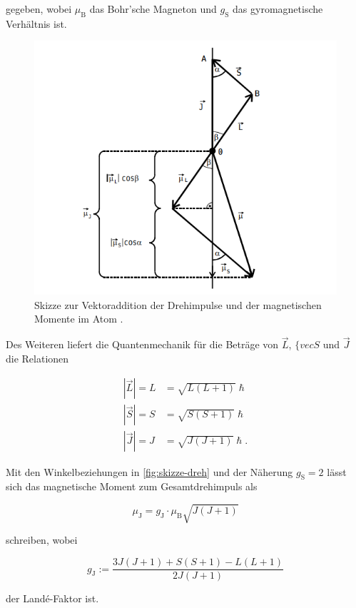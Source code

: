 gegeben, wobei $\mu_\text{B}$ das Bohr'sche Magneton und $g_\text{S}$ das gyromagnetische Verhältnis ist.

\begin{figure}
    \centering
    \includegraphics{skizze-drehimpuls.png}
    \caption{Skizze zur Vektoraddition der Drehimpulse und der magnetischen Momente im Atom \cite{V606}.}
    \label{fig:skizze-dreh}
\end{figure}

Des Weiteren liefert die Quantenmechanik für die Beträge von $\vec{L}$, $\{vec{S}$ und $\vec{J}$ die Relationen

\begin{align} 
    |\vec{L}| = L &= \sqrt{ L ( L + 1 ) } \hslash \\
    |\vec{S}| = S &= \sqrt{ S ( S + 1 ) } \hslash \\
    |\vec{J}| = J &= \sqrt{ J ( J + 1 ) } \hslash.
\end{align}

Mit den Winkelbeziehungen in \autoref{fig:skizze-dreh} und der Näherung $g_\text{S} = 2$ lässt sich das magnetische Moment zum Gesamtdrehimpuls als

\begin{equation}
    \label{eqn:magn-moment}
    \mu_\text{J} = g_\text{J} \cdot \mu_\text{B} \sqrt{J (J + 1)}
\end{equation}

schreiben, wobei 

\begin{equation}
    \label{eqn:lande}
    g_\text{J} := \frac{ 3 J (J+1) + S(S+1) - L(L+1) }{ 2 J (J +1) }
\end{equation}

der Landé-Faktor ist.
